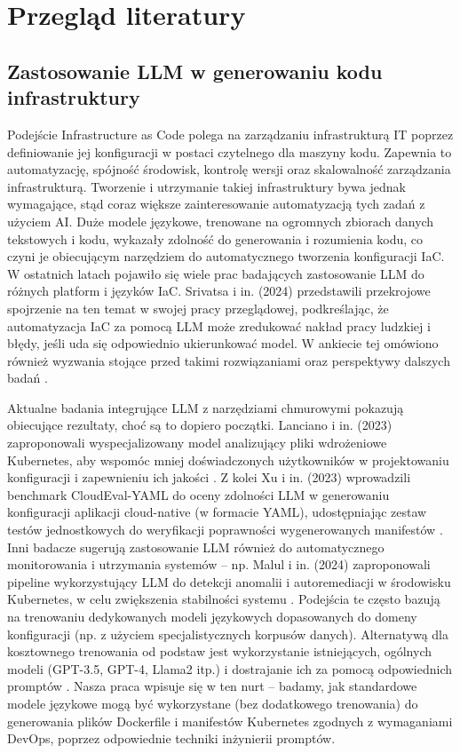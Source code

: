 \clearpage %
\section{Przegląd literatury}

\subsection{Zastosowanie LLM w generowaniu kodu infrastruktury}

Podejście Infrastructure as Code polega na zarządzaniu infrastrukturą IT poprzez definiowanie jej konfiguracji w postaci czytelnego dla maszyny kodu. Zapewnia to automatyzację, spójność środowisk, kontrolę wersji oraz skalowalność zarządzania infrastrukturą. Tworzenie i utrzymanie takiej infrastruktury bywa jednak wymagające, stąd coraz większe zainteresowanie automatyzacją tych zadań z użyciem AI. Duże modele językowe, trenowane na ogromnych zbiorach danych tekstowych i kodu, wykazały zdolność do generowania i rozumienia kodu, co czyni je obiecującym narzędziem do automatycznego tworzenia konfiguracji IaC. W ostatnich latach pojawiło się wiele prac badających zastosowanie LLM do różnych platform i języków IaC. Srivatsa i in. (2024) przedstawili przekrojowe spojrzenie na ten temat w swojej pracy przeglądowej, podkreślając, że automatyzacja IaC za pomocą LLM może zredukować nakład pracy ludzkiej i błędy, jeśli uda się odpowiednio ukierunkować model. W ankiecie tej omówiono również wyzwania stojące przed takimi rozwiązaniami oraz perspektywy dalszych badań \cite{srivatsa_survey_2024}.

Aktualne badania integrujące LLM z narzędziami chmurowymi pokazują obiecujące rezultaty, choć są to dopiero początki. Lanciano i in. (2023) zaproponowali wyspecjalizowany model analizujący pliki wdrożeniowe Kubernetes, aby wspomóc mniej doświadczonych użytkowników w projektowaniu konfiguracji i zapewnieniu ich jakości \cite{lanciano_analyzing_2023}. Z kolei Xu i in. (2023) wprowadzili benchmark CloudEval-YAML do oceny zdolności LLM w generowaniu konfiguracji aplikacji cloud-native (w formacie YAML), udostępniając zestaw testów jednostkowych do weryfikacji poprawności wygenerowanych manifestów \cite{ueno_migrating_2024}. Inni badacze sugerują zastosowanie LLM również do automatycznego monitorowania i utrzymania systemów – np. Malul i in. (2024) zaproponowali pipeline wykorzystujący LLM do detekcji anomalii i autoremediacji w środowisku Kubernetes, w celu zwiększenia stabilności systemu \cite{malul_genkubesec_2024}. Podejścia te często bazują na trenowaniu dedykowanych modeli językowych dopasowanych do domeny konfiguracji (np. z użyciem specjalistycznych korpusów danych). Alternatywą dla kosztownego trenowania od podstaw jest wykorzystanie istniejących, ogólnych modeli (GPT-3.5, GPT-4, Llama2 itp.) i dostrajanie ich za pomocą odpowiednich promptów \cite{kratzke_dont_2024}. Nasza praca wpisuje się w ten nurt – badamy, jak standardowe modele językowe mogą być wykorzystane (bez dodatkowego trenowania) do generowania plików Dockerfile i manifestów Kubernetes zgodnych z wymaganiami DevOps, poprzez odpowiednie techniki inżynierii promptów.

